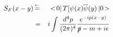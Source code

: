 \begin{eqnarray}
S_F(x - y) &\,\mbox{$\stackrel{\leftarrow}{=}$}\,&
<\! 0 |\, T[ \psi(x) \overline{\psi}(y) \,| 0 \!>
\\
&=&
i \int \frac{d^4 p}{(2\pi)^4}
\frac{e^{-ip(x-y)}}{\slashed{p} - m + i\epsilon}
\end{eqnarray}
\begin{comment}
\begin{eqnarray}
S_F(q) &=& i \int d^4x e^{iqx}
\bra 0 \braend T[\psi(x) \bar{\psi}(0)]
\ketend 0 \ket
\nonumber\\
&=&
\frac{-1}{\slashed{q} - m + i \epsilon}
=
- \frac{\slashed{q} + m}{ q^2 - m^2 + i \epsilon}
\end{eqnarray}
\end{comment}


